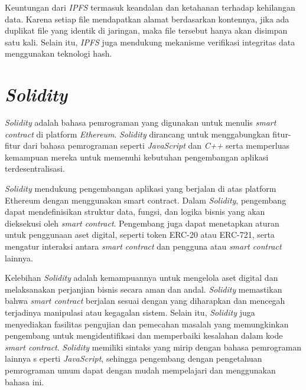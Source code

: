 Keuntungan dari \emph{IPFS} termasuk keandalan dan ketahanan terhadap kehilangan data. Karena setiap file mendapatkan alamat berdasarkan kontennya, jika ada duplikat file yang identik di jaringan,
maka file tersebut hanya akan disimpan satu kali. Selain itu, \emph{IPFS} juga mendukung mekanisme verifikasi integritas data menggunakan teknologi hash. \parencite{batiz2018mastering}

\section{\emph{Solidity}}

\emph{Solidity} adalah bahasa pemrograman yang digunakan untuk menulis \emph{smart contract} di platform \emph{Ethereum}. \emph{Solidity} dirancang untuk menggabungkan fitur-fitur dari bahasa
pemrograman seperti \emph{JavaScript} dan \emph{C++} serta memperluas kemampuan mereka untuk memenuhi kebutuhan pengembangan aplikasi terdesentralisasi.

\emph{Solidity} mendukung pengembangan aplikasi yang berjalan di atas platform Ethereum dengan menggunakan smart contract. Dalam \emph{Solidity}, pengembang dapat mendefinisikan struktur data,
fungsi, dan logika bisnis yang akan dieksekusi oleh \emph{smart contract}. Pengembang juga dapat menetapkan aturan untuk penggunaan aset digital, seperti token ERC-20 atau ERC-721, serta mengatur
interaksi antara \emph{smart contract} dan pengguna atau \emph{smart contract} lainnya. \parencite{noauthor_solidity_nodate}

Kelebihan \emph{Solidity} adalah kemampuannya untuk mengelola aset digital dan melaksanakan perjanjian bisnis secara aman dan andal. \emph{Solidity} memastikan bahwa \emph{smart contract}
berjalan sesuai dengan yang diharapkan dan mencegah terjadinya manipulasi atau kegagalan sistem. Selain itu, \emph{Solidity} juga menyediakan fasilitas pengujian dan pemecahan masalah
yang memungkinkan pengembang untuk mengidentifikasi dan memperbaiki kesalahan dalam kode \emph{smart contract}. \emph{Solidity} memiliki sintaks yang mirip dengan bahasa pemrograman lainnya s
eperti \emph{JavaScript}, sehingga pengembang dengan pengetahuan pemrograman umum dapat dengan mudah mempelajari dan menggunakan bahasa ini.

